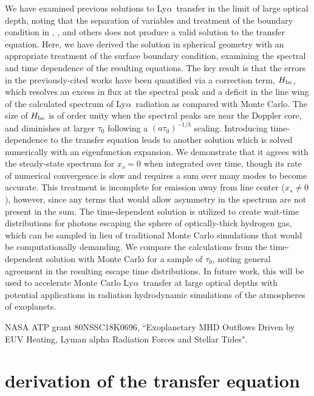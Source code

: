 \documentclass[linenumbers]{aastex63}
\newcommand\lya{Ly$\alpha$\ }
\begin{document}
We have examined previous solutions to \lya transfer in the limit of large optical depth, noting that the separation of variables and treatment of the boundary condition in \cite{1973MNRAS.162...43H}, \cite{1990ApJ...350..216N}, \cite{2006ApJ...649...14D} and others does not produce a valid solution to the transfer equation. Here, we have derived the solution in spherical geometry with an appropriate treatment of the surface boundary condition, examining the spectral and time dependence of the resulting equations. The key result is that the errors in the previously-cited works have been quantified via a correction term, $H_{\rm bc}$, which resolves an excess in flux at the spectral peak and a deficit in the line wing of the calculated spectrum of \lya radiation as compared with Monte Carlo. The size of $H_{\rm bc}$ is of order unity when the spectral peaks are near the Doppler core, and diminishes at larger $\tau_0$ following a $(a\tau_0)^{-1/3}$ scaling. Introducing time-dependence to the transfer equation leads to another solution which is solved numerically with an eigenfunction expansion. We demonstrate that it agrees with the steady-state spectrum for $x_s=0$ when integrated over time, though its rate of numerical convergence is slow and requires a sum over many modes to become accurate. This treatment is incomplete for emission away from line center ($x_s\neq0$), however, since any terms that would allow asymmetry in the spectrum are not present in the sum. The time-dependent solution is utilized to create wait-time distributions for photons escaping the sphere of optically-thick hydrogen gas, which can be sampled in lieu of traditional Monte Carlo simulations that would be computationally demanding. We compare the calculations from the time-dependent solution with Monte Carlo for a sample of $\tau_0$, noting general agreement in the resulting escape time distributions. In future work, this will be used to accelerate Monte Carlo \lya transfer at large optical depths with potential applications in radiation hydrodynamic simulations of the atmospheres of exoplanets.

\acknowledgments

NASA ATP grant 80NSSC18K0696, ``Exoplanetary MHD Outflows Driven by EUV Heating, Lyman alpha Radiation Forces and Stellar Tides".
\restartappendixnumbering

\appendix
\section{ derivation of the transfer equation } \label{app:rteqn_derivation}
\end{document}
